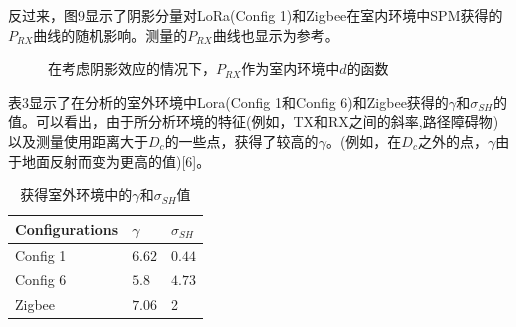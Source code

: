 \documentclass[10pt]{ctexart}
\begin{document}
反过来，图9显示了阴影分量对LoRa(Config 1)和Zigbee在室内环境中SPM获得的$P_{RX}$曲线的随机影响。测量的$P_{RX}$曲线也显示为参考。

\begin{figure}[H]
  \renewcommand{\figurename}{图}
  \caption{在考虑阴影效应的情况下，$P_{R X}$作为室内环境中$d$的函数}
\end{figure}

表3显示了在分析的室外环境中Lora(Config 1和Config 6)和Zigbee获得的$\gamma$和$\sigma_{SH}$的值。可以看出，由于所分析环境的特征(例如，TX和RX之间的斜率,路径障碍物)以及测量使用距离大于$D_{c}$的一些点，获得了较高的$\gamma$。(例如，在$D_{c}$之外的点，$\gamma$由于地面反射而变为更高的值)[6]。

\begin{table}[H]
  \centering
  \renewcommand{\tablename}{表}
  \caption{获得室外环境中的$\gamma$和$\sigma_{SH}$值}
  \begin{tabular}{l|l|l}
  \hline
  Configurations & $\gamma$ & $\sigma_{S H}$ \\
  \hline
  Config 1 & $6.62$ & $0.44$ \\
  \hline
  Config 6 & $5.8$ & $4.73$ \\
  \hline
  Zigbee & $7.06$ & 2 \\
  \hline
  \end{tabular}
\end{table}
\end{document}
